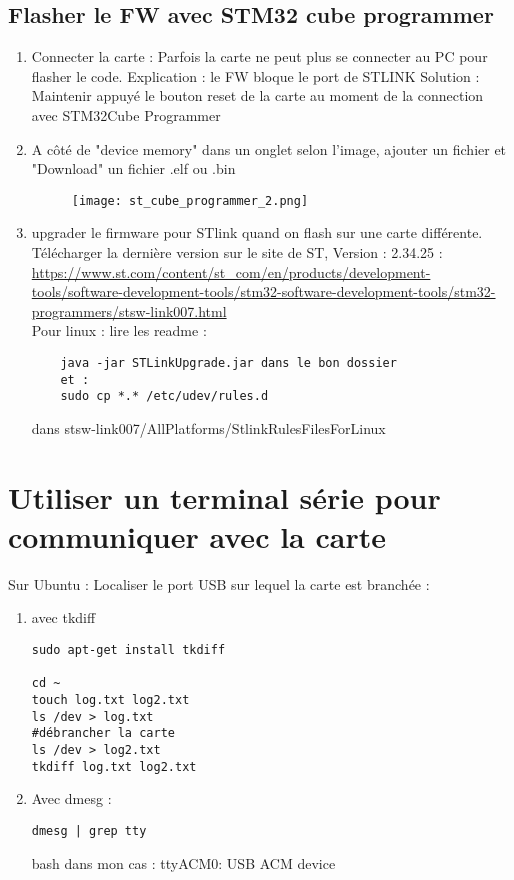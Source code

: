 \documentclass{article}
\begin{document}
\subsection{Flasher le FW avec STM32 cube programmer}

\begin{enumerate}


      \item Connecter la carte : Parfois la carte ne peut plus se connecter au PC pour flasher le code.
    Explication : le FW bloque le port de STLINK
    Solution : Maintenir appuyé le bouton reset de la carte au moment de la connection avec STM32Cube Programmer

    \item 
    A côté de "device memory" dans un onglet selon l'image, ajouter un fichier et "Download" un fichier .elf ou .bin
    
    
    \begin{figure}[H]
\begin{center}
\advance\leftskip-3cm
\advance\rightskip-3cm
\texttt{[image: st\_cube\_programmer\_2.png]}
\label{visina8}
\end{center}\end{figure}
    
    
    \item upgrader le firmware pour STlink quand on flash sur une carte différente.
    Télécharger la dernière version sur le site de ST, Version : 2.34.25  : \url{https://www.st.com/content/st_com/en/products/development-tools/software-development-tools/stm32-software-development-tools/stm32-programmers/stsw-link007.html} \\
    Pour linux : lire les readme : 
    \begin{verbatim}
    java -jar STLinkUpgrade.jar dans le bon dossier
    et :
    sudo cp *.* /etc/udev/rules.d
    \end{verbatim}
    dans stsw-link007/AllPlatforms/StlinkRulesFilesForLinux
\end{enumerate}



\section{Utiliser un terminal série pour communiquer avec la carte}


Sur Ubuntu :
Localiser le port USB sur lequel la carte est branchée : 
\begin{enumerate}
\item avec tkdiff
\begin{verbatim}
sudo apt-get install tkdiff

cd ~
touch log.txt log2.txt
ls /dev > log.txt
#débrancher la carte
ls /dev > log2.txt
tkdiff log.txt log2.txt
\end{verbatim}


\item Avec dmesg :


\begin{verbatim}
dmesg | grep tty 
\end{verbatim}{bash}
dans mon cas : ttyACM0: USB ACM device

\end{enumerate}
\end{document}

